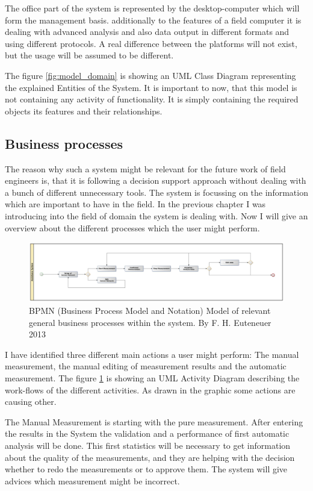 The office part of the system is represented by the desktop-computer which will form the management basis. additionally to the features of a field computer it is dealing with advanced analysis and also data output in different formats and using different protocols. A real difference between the platforms will not exist, but the usage will be assumed to be different.

The figure \ref{fig:model_domain} is showing an UML Class Diagram representing the explained Entities of the System. It is important to now, that this model is not containing any activity of functionality. It is simply containing the required objects its features and their relationships. 


\subsection{Business processes}
The reason why such a system might be relevant for the future work of field engineers is, that it is following a decision support approach without dealing with a bunch of different unnecessary tools. The system is focussing on the information which are important to have in the field. In the previous chapter I was introducing into the field of domain the system is dealing with. Now I will give an overview about the different processes which the user might perform.

\begin{figure}[H]
	\centering
 	 \includegraphics[scale=0.2]{graphics/bpmn_business-processes.jpg} 
	\caption{BPMN (Business Process Model and Notation) Model of relevant general business processes within the system. By F. H. Euteneuer 2013}
	 \label{fig:model_business-processes}
\end{figure}
I have identified three different main actions a user might perform: The manual measurement, the manual editing of measurement results and the automatic measurement. The figure \ref{fig:model_business-processes} is showing an UML Activity Diagram describing the work-flows of the different activities. As drawn in the graphic some actions are causing other.

The Manual Measurement is starting with the pure measurement. After entering the results in the System the validation and a performance of first automatic analysis will be done. This first statistics will be necessary to get information about the quality of the measurements, and they are helping with the decision whether to redo the measurements or to approve them. The system will give advices which measurement might be incorrect.

